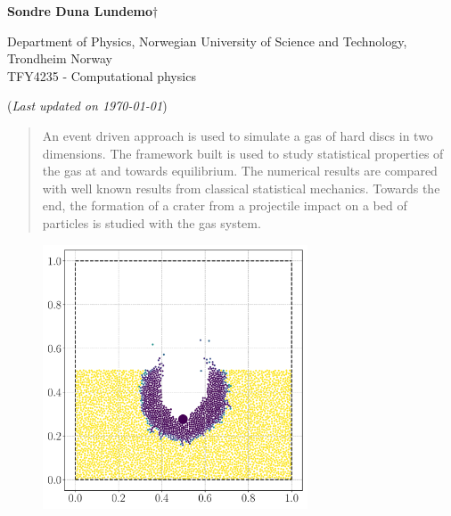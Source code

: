


	
\begin{titlepage}
	\begin{center}
	\setlength{\parskip}{0em}
	\thispagestyle{titlepage}
	

	\vspace{4mm}
	
	\large{\textbf{Sondre Duna Lundemo}}$\dagger$
	
	\normalsize{Department of Physics, Norwegian University of Science and Technology, Trondheim Norway \\
	TFY4235 - Computational physics
	}

	(\textit{Last updated on \today})
	\end{center}

	\setlength{\parindent}{2em}
	
	\begin{abstract}
		An event driven approach is used to simulate a gas of hard discs in two dimensions. The framework built is used to study statistical properties of the gas at and towards equilibrium. The numerical results are compared with well known results from classical statistical mechanics. Towards the end, the formation of a crater from a projectile impact on a bed of particles is studied with the gas system. 
	\end{abstract}
	
	\begin{figure}[h]
		\centering
		\includegraphics[width=0.7\textwidth]{../fig/crater_2}
	\end{figure}
	

\end{titlepage}

